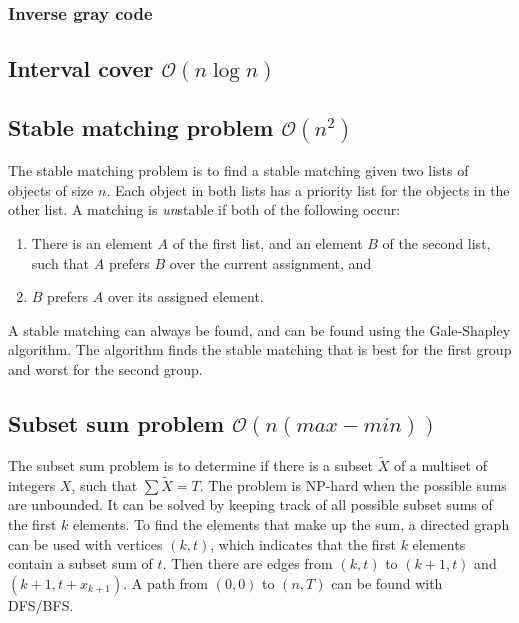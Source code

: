 \subsubsection{Inverse gray code}



\subsection{Interval cover $\mathcal O(n\log n)$}




\subsection{Stable matching problem $\mathcal O(n^2)$}

The stable matching problem is to find a stable matching given two lists of objects of size $n$. Each object in both lists has a priority list for the objects in the other list. A matching is \textit{un}stable if both of the following occur:
\begin{enumerate}
    \item There is an element $A$ of the first list, and an element $B$ of the second list, such that $A$ prefers $B$ over the current assignment, and
    \item $B$ prefers $A$ over its assigned element.
\end{enumerate}
A stable matching can always be found, and can be found using the Gale-Shapley algorithm. The algorithm finds the stable matching that is best for the first group and worst for the second group.



\subsection{Subset sum problem $\mathcal O(n(max - min))$}

The subset sum problem is to determine if there is a subset $\tilde X$ of a multiset of integers $X$, such that $\sum \tilde X = T$. The problem is NP-hard when the possible sums are unbounded. It can be solved by keeping track of all possible subset sums of the first $k$ elements. To find the elements that make up the sum, a directed graph can be used with vertices $(k, t)$, which indicates that the first $k$ elements contain a subset sum of $t$. Then there are edges from $(k, t)$ to $(k + 1, t)$ and $(k + 1, t + x_{k + 1})$. A path from $(0, 0)$ to $(n, T)$ can be found with DFS/BFS.



